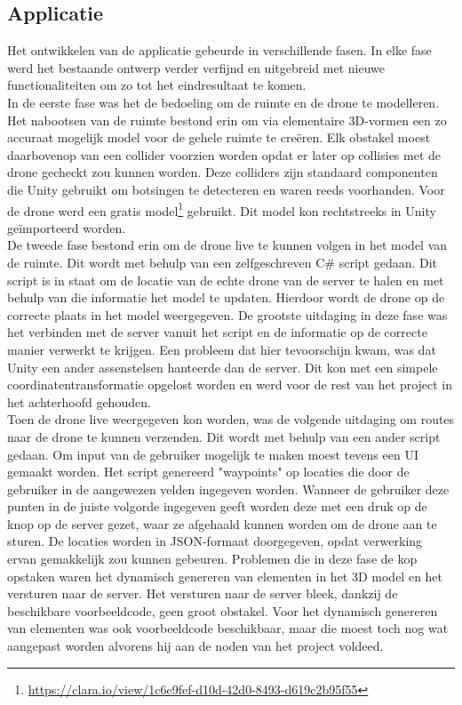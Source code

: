 \subsection{Applicatie} \label{sec:unity}
Het ontwikkelen van de applicatie gebeurde in verschillende fasen.
In elke fase werd het bestaande ontwerp verder verfijnd en uitgebreid met nieuwe functionaliteiten om zo tot het eindresultaat te komen.\\

In de eerste fase was het de bedoeling om de ruimte en de drone te modelleren.
Het nabootsen van de ruimte bestond erin om via elementaire 3D-vormen een zo accuraat mogelijk model voor de gehele ruimte te creëren.
Elk obstakel moest daarbovenop van een collider voorzien worden opdat er later op collisies met de drone gecheckt zou kunnen worden.
Deze colliders zijn standaard componenten die Unity gebruikt om botsingen te detecteren en waren reeds voorhanden.
Voor de drone werd een gratis model\footnote{\url{https://clara.io/view/1c6e9fef-d10d-42d0-8493-d619c2b95f55}} gebruikt.
Dit model kon rechtstreeks in Unity geïmporteerd worden.\\

De tweede fase bestond erin om de drone live te kunnen volgen in het model van de ruimte.
Dit wordt met behulp van een zelfgeschreven C\# script gedaan.
Dit script is in staat om de locatie van de echte drone van de server te halen en met behulp van die informatie het model te updaten.
Hierdoor wordt de drone op de correcte plaats in het model weergegeven.
De grootste uitdaging in deze fase was het verbinden met de server vanuit het script en de informatie op de correcte manier verwerkt te krijgen.
Een probleem dat hier tevoorschijn kwam, was dat Unity een ander assenstelsen hanteerde dan de server.
Dit kon met een simpele coordinatentransformatie opgelost worden en werd voor de rest van het project in het achterhoofd gehouden.\\

Toen de drone live weergegeven kon worden, was de volgende uitdaging om routes naar de drone te kunnen verzenden.
Dit wordt met behulp van een ander script gedaan.
Om input van de gebruiker mogelijk te maken moest tevens een UI gemaakt worden.
Het script genereerd "waypoints" op locaties die door de gebruiker in de aangewezen velden ingegeven worden.
Wanneer de gebruiker deze punten in de juiste volgorde ingegeven geeft worden deze met een druk op de knop op de server gezet, waar ze afgehaald kunnen worden om de drone aan te sturen.
De locaties worden in JSON-formaat doorgegeven, opdat verwerking ervan gemakkelijk zou kunnen gebeuren.
Problemen die in deze fase de kop opstaken waren het dynamisch genereren van elementen in het 3D model en het versturen naar de server.
Het versturen naar de server bleek, dankzij de beschikbare voorbeeldcode, geen groot obstakel.
Voor het dynamisch genereren van elementen was ook voorbeeldcode beschikbaar, maar die moest toch nog wat aangepast worden alvorens hij aan de noden van het project voldeed.\\

